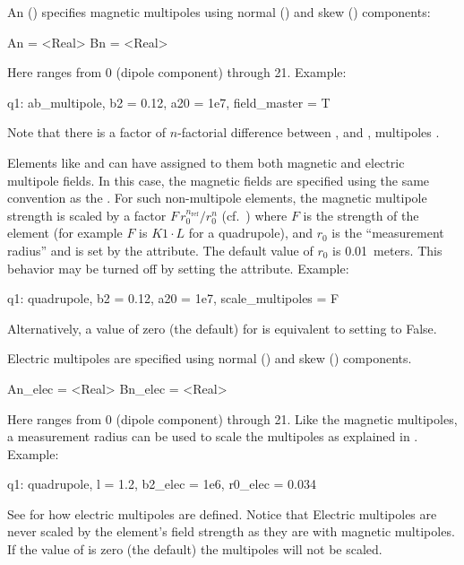 An  () specifies magnetic multipoles
using normal () and skew () components:
\begin{example}
  An = <Real>
  Bn = <Real>
\end{example}
Here  ranges from 0 (dipole component) through 21. Example:
\begin{example}
  q1: ab_multipole, b2 = 0.12, a20 = 1e7, field_master = T
\end{example}
Note that there is a factor of $n$-factorial difference between ,  and ,
 multipoles .

Elements like  and  can have assigned to them both magnetic and
electric multipole fields. In this case, the magnetic fields are specified using the same convention
as the .  For such non-multipole elements, the magnetic multipole strength is
scaled by a factor $F \, r_0^{n_\text{ref}} / r_0^n$ (cf.~) where $F$ is the strength of
the element (for example $F$ is $K1 \cdot L$ for a quadrupole), and $r_0$ is the ``measurement
radius'' and is set by the  attribute. The default value of $r_0$ is 0.01~meters.  This
behavior may be turned off by setting the  attribute.  Example:
\begin{example}
  q1: quadrupole, b2 = 0.12, a20 = 1e7, scale_multipoles = F
\end{example}
Alternatively, a value of zero (the default) for  is equivalent to setting
 to False.

Electric multipoles are specified using normal () and skew
() components. \begin{example}
  An_elec = <Real>
  Bn_elec = <Real>
\end{example}
Here  ranges from 0 (dipole component) through 21. Like the magnetic multipoles, a measurement
radius  can be used to scale the multipoles as explained in .
Example:
\begin{example}
  q1: quadrupole, l = 1.2, b2_elec = 1e6, r0_elec = 0.034
\end{example}
See  for how electric multipoles are defined. Notice that Electric multipoles are
never scaled by the element's field strength as they are with magnetic multipoles. If the value of
 is zero (the default) the multipoles will not be scaled.

